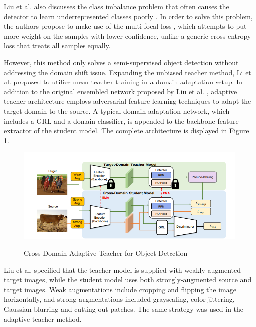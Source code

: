 \documentclass[english, 12pt, a4paper, elec, utf8, a-1b, online]{aaltothesis}
\begin{document}
Liu et al. also discusses the class imbalance problem that often causes the detector to learn underrepresented classes poorly \cite{Liu2021}. In order to solve this problem, the authors propose to make use of the multi-focal loss \cite{Lin2017}, which attempts to put more weight on the samples with lower confidence, unlike a generic cross-entropy loss that treats all samples equally. 

However, this method only solves a semi-supervised object detection without addressing the domain shift issue. Expanding the unbiased teacher method, Li et al.\cite{Li2021} proposed to utilize mean teacher training in a domain adaptation setup. In addition to the original ensembled network proposed by Liu et al. \cite{Liu2021}, adaptive teacher architecture employs adversarial feature learning techniques to adapt the target domain to the source. A typical domain adaptation network, which includes a GRL and a domain classifier, is appended to the backbone feature extractor of the student model. The complete architecture is displayed in Figure \ref{adapt_teacher}. 
 
\begin{figure}[htb]
	\begin{center}
		\includegraphics[width=16cm]{./adapt_teacher.png}
	\end{center}
	\caption{Cross-Domain Adaptive Teacher for Object Detection
\cite{Li2021}}
	\begin{center}
		\label{adapt_teacher}
	\end{center}
\end{figure}
\FloatBarrier

Liu et al.\cite{Liu2021} specified that the teacher model is supplied with weakly-augmented target images, while the student model uses both strongly-augmented source and target images. Weak augmentations include cropping and flipping the image horizontally, and strong augmentations included grayscaling, color jittering, Gaussian blurring and cutting out patches. The same strategy was used in the adaptive teacher method. 
\end{document}
